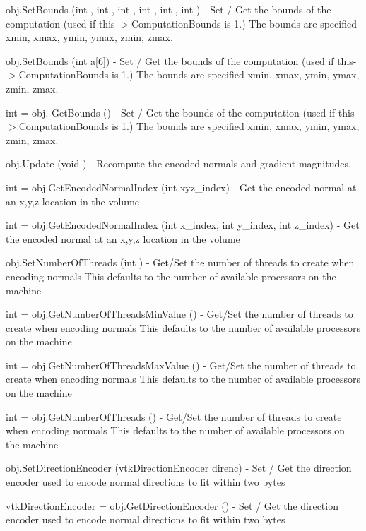 \begin{DoxyItemize}
\item {\ttfamily obj.\-Set\-Bounds (int , int , int , int , int , int )} -\/ Set / Get the bounds of the computation (used if this-\/$>$Computation\-Bounds is 1.) The bounds are specified xmin, xmax, ymin, ymax, zmin, zmax.  
\item {\ttfamily obj.\-Set\-Bounds (int a\mbox{[}6\mbox{]})} -\/ Set / Get the bounds of the computation (used if this-\/$>$Computation\-Bounds is 1.) The bounds are specified xmin, xmax, ymin, ymax, zmin, zmax.  
\item {\ttfamily int = obj. Get\-Bounds ()} -\/ Set / Get the bounds of the computation (used if this-\/$>$Computation\-Bounds is 1.) The bounds are specified xmin, xmax, ymin, ymax, zmin, zmax.  
\item {\ttfamily obj.\-Update (void )} -\/ Recompute the encoded normals and gradient magnitudes.  
\item {\ttfamily int = obj.\-Get\-Encoded\-Normal\-Index (int xyz\-\_\-index)} -\/ Get the encoded normal at an x,y,z location in the volume  
\item {\ttfamily int = obj.\-Get\-Encoded\-Normal\-Index (int x\-\_\-index, int y\-\_\-index, int z\-\_\-index)} -\/ Get the encoded normal at an x,y,z location in the volume  
\item {\ttfamily obj.\-Set\-Number\-Of\-Threads (int )} -\/ Get/\-Set the number of threads to create when encoding normals This defaults to the number of available processors on the machine  
\item {\ttfamily int = obj.\-Get\-Number\-Of\-Threads\-Min\-Value ()} -\/ Get/\-Set the number of threads to create when encoding normals This defaults to the number of available processors on the machine  
\item {\ttfamily int = obj.\-Get\-Number\-Of\-Threads\-Max\-Value ()} -\/ Get/\-Set the number of threads to create when encoding normals This defaults to the number of available processors on the machine  
\item {\ttfamily int = obj.\-Get\-Number\-Of\-Threads ()} -\/ Get/\-Set the number of threads to create when encoding normals This defaults to the number of available processors on the machine  
\item {\ttfamily obj.\-Set\-Direction\-Encoder (vtk\-Direction\-Encoder direnc)} -\/ Set / Get the direction encoder used to encode normal directions to fit within two bytes  
\item {\ttfamily vtk\-Direction\-Encoder = obj.\-Get\-Direction\-Encoder ()} -\/ Set / Get the direction encoder used to encode normal directions to fit within two bytes  

\end{DoxyItemize}
